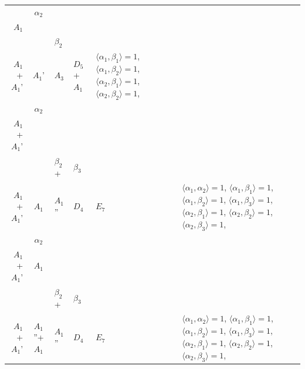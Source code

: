 \documentclass[12pt]{report}
\begin{document}
\begin{appendix}
{\begin{longtable}{rcl p{1cm}p{1cm}p{3cm} }
\\
\begin{tabular}{cc}$\alpha_1$+ & $\alpha_2$\\\tiny{ $A_1$ } & \tiny{  }\end{tabular} &\begin{tabular}{c} = \\~ \end{tabular} & \begin{tabular}{cc}$\beta_1$+ & $\beta_2$\\\tiny{ $A_1$+$A_1$' } & \tiny{ $A_1$' }\end{tabular} & $A_3$ & $D_5$+$A_1$ &  $\langle\alpha_1, \beta_1\rangle=1$, $\langle\alpha_1, \beta_2\rangle=1$, $\langle\alpha_2, \beta_1\rangle=1$, $\langle\alpha_2, \beta_2\rangle=1$, 
\\
\begin{tabular}{cc}$\alpha_1$+ & $\alpha_2$\\\tiny{ $A_1$+$A_1$' } & \tiny{  }\end{tabular} &\begin{tabular}{c} = \\~ \end{tabular} & \begin{tabular}{ccc}$\beta_1$+ & $\beta_2$+ & $\beta_3$\\\tiny{ $A_1$+$A_1$' } & \tiny{ $A_1$ } & \tiny{ $A_1$'' }\end{tabular} & $D_4$ & $E_7$ & $\langle\alpha_1, \alpha_2\rangle=1$,  $\langle\alpha_1, \beta_1\rangle=1$, $\langle\alpha_1, \beta_2\rangle=1$, $\langle\alpha_1, \beta_3\rangle=1$, $\langle\alpha_2, \beta_1\rangle=1$, $\langle\alpha_2, \beta_2\rangle=1$, $\langle\alpha_2, \beta_3\rangle=1$, 
\\
\begin{tabular}{cc}$\alpha_1$+ & $\alpha_2$\\\tiny{ $A_1$+$A_1$' } & \tiny{ $A_1$ }\end{tabular} &\begin{tabular}{c} = \\~ \end{tabular} & \begin{tabular}{ccc}$\beta_1$+ & $\beta_2$+ & $\beta_3$\\\tiny{ $A_1$+$A_1$' } & \tiny{ $A_1$''+$A_1$ } & \tiny{ $A_1$'' }\end{tabular} & $D_4$ & $E_7$ & $\langle\alpha_1, \alpha_2\rangle=1$,  $\langle\alpha_1, \beta_1\rangle=1$, $\langle\alpha_1, \beta_2\rangle=1$, $\langle\alpha_1, \beta_3\rangle=1$, $\langle\alpha_2, \beta_1\rangle=1$, $\langle\alpha_2, \beta_2\rangle=1$, $\langle\alpha_2, \beta_3\rangle=1$, 

\end{longtable}}
\end{appendix}
\end{document}
